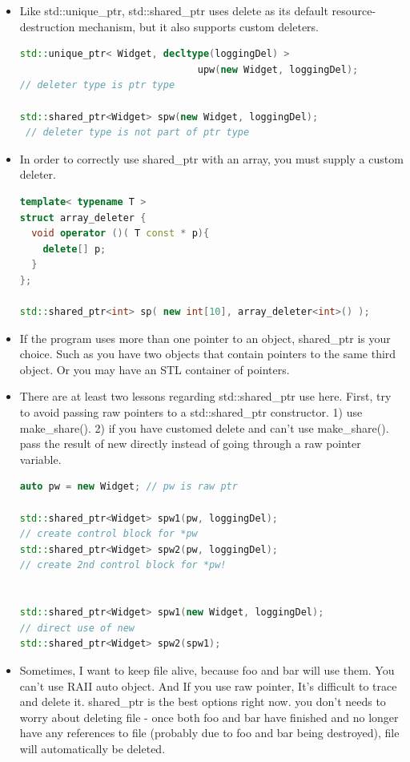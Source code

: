 \documentclass[a4paper,12pt,twoside]{book}
\begin{document}
\begin{itemize}
\item Like std::unique\_ptr, std::shared\_ptr uses delete as its default resource-destruction mechanism, but it also supports custom deleters.
\begin{lstlisting}[frame=single, language=c++]
std::unique_ptr< Widget, decltype(loggingDel) >
                               upw(new Widget, loggingDel);
// deleter type is ptr type

std::shared_ptr<Widget> spw(new Widget, loggingDel);
 // deleter type is not part of ptr type
\end{lstlisting}

\item In order to correctly use shared\_ptr with an array, you must supply a custom deleter.
\begin{lstlisting}[frame=single, language=c++]
template< typename T >
struct array_deleter {
  void operator ()( T const * p){
    delete[] p;
  }
};

std::shared_ptr<int> sp( new int[10], array_deleter<int>() );
\end{lstlisting}


\item If the program uses more than one pointer to an object, shared\_ptr is your choice.  Such as you have two objects that contain pointers to the same third object. Or you may have an STL container of pointers.

\item There are at least two lessons regarding std::shared\_ptr use here. First, try to
avoid passing raw pointers to a std::shared\_ptr constructor. 1) use make\_share(). 2) if you have customed delete and can't use make\_share().   pass the result of new directly
instead of going through a raw pointer variable.

\begin{lstlisting}[frame=single, language=c++]
auto pw = new Widget; // pw is raw ptr

std::shared_ptr<Widget> spw1(pw, loggingDel);
// create control block for *pw
std::shared_ptr<Widget> spw2(pw, loggingDel);
// create 2nd control block for *pw!


std::shared_ptr<Widget> spw1(new Widget, loggingDel);
// direct use of new
std::shared_ptr<Widget> spw2(spw1);
\end{lstlisting}


\item Sometimes, I want to keep file alive, because foo and bar will use them. You can't use RAII auto object. And If you use raw pointer, It's difficult to trace and delete it. shared\_ptr is the best options right now.  you don't needs to worry about deleting file - once both foo and bar have finished and no longer have any references to file (probably due to foo and bar being destroyed), file will automatically be deleted.


\end{itemize}
\end{document}
